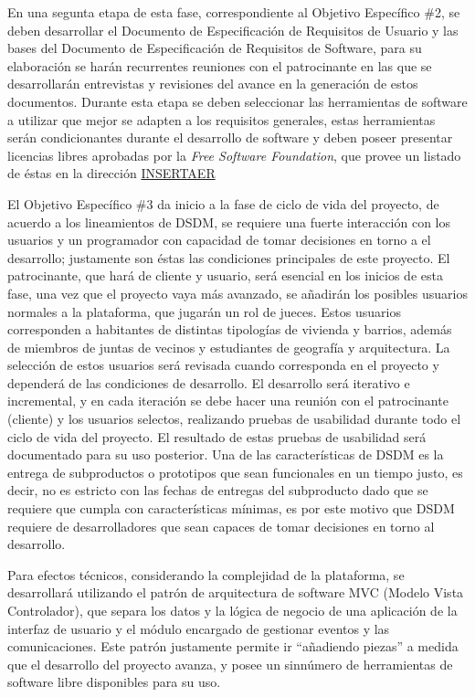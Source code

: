 \documentclass[12pt]{article}
\begin{document}
En una
segunta etapa de esta fase, correspondiente al Objetivo Específico \#2, se
deben desarrollar el Documento de Especificación de Requisitos de
Usuario y las bases del Documento de Especificación de Requisitos de Software,
para su elaboración se harán recurrentes reuniones con el patrocinante en las
que se desarrollarán entrevistas y revisiones del avance en la generación de
estos documentos.
Durante esta etapa se deben seleccionar las herramientas de
software a utilizar que mejor se adapten a los requisitos generales, estas
herramientas serán condicionantes durante el desarrollo de software y deben
poseer presentar licencias libres aprobadas por la \emph{Free Software
Foundation}, que provee un listado de éstas en la dirección \url{INSERTAER}


El Objetivo Específico \#3 da inicio a la fase de ciclo de vida del proyecto, de acuerdo a los lineamientos de
DSDM, se requiere una fuerte interacción con los usuarios y un programador con
capacidad de tomar decisiones en torno a el desarrollo; justamente son éstas las
condiciones principales de este proyecto. El patrocinante, que hará de cliente y usuario,
será esencial en los inicios de esta fase, una vez que el proyecto vaya más
avanzado, se añadirán los posibles usuarios normales a la plataforma, que
jugarán un rol de jueces. Estos usuarios corresponden a habitantes de distintas
tipologías de vivienda y barrios, además de miembros de juntas de vecinos y
estudiantes de geografía y arquitectura. La selección de estos usuarios será
revisada cuando corresponda en el proyecto y dependerá de las condiciones de
desarrollo. El desarrollo será iterativo e incremental, y en cada iteración se
debe hacer una reunión con el patrocinante (cliente) y los usuarios selectos,
realizando pruebas de usabilidad durante todo el ciclo de vida del proyecto. 
El resultado de estas pruebas de usabilidad será documentado para su uso
posterior. Una de las características de DSDM es la entrega de subproductos o
prototipos que sean funcionales en un tiempo justo, es decir, no es estricto con
las fechas de entregas del subproducto dado que se requiere que cumpla con
características mínimas, es por este motivo que DSDM requiere de desarrolladores
que sean capaces de tomar decisiones en torno al desarrollo.

Para efectos
técnicos, considerando la complejidad de la plataforma, se desarrollará
utilizando el patrón de arquitectura de software MVC (Modelo Vista Controlador),
que separa los datos y la lógica de negocio de una aplicación de la interfaz de
usuario y el módulo encargado de gestionar eventos y las comunicaciones. Este
patrón justamente permite ir ``añadiendo piezas'' a medida que el desarrollo del
proyecto avanza, y posee un sinnúmero de herramientas de software libre
disponibles para su uso.
\end{document}
